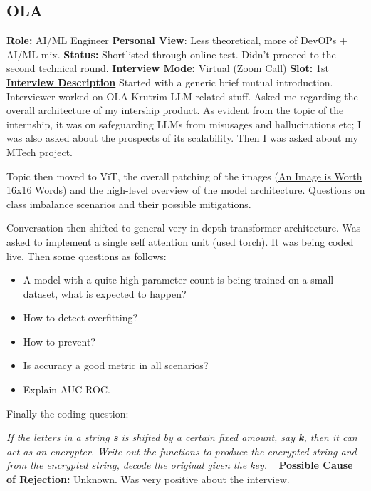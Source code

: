 \documentclass[12pt]{article}
\begin{document}
\subsection{OLA}


\textbf{Role:} AI/ML Engineer
\newline
\textbf{Personal View}: Less theoretical, more of DevOPs + AI/ML mix.
\newline
\textbf{Status:} Shortlisted through online test. Didn't proceed to the second technical round.
\newline
\textbf{Interview Mode:} Virtual (Zoom Call)
\newline
\textbf{Slot:} 1st
\vspace{10pt}
\newline
\underline{\textbf{Interview Description}}
\newline
\newline
Started with a generic brief mutual introduction. Interviewer worked on OLA Krutrim LLM related stuff. Asked me regarding the overall architecture of my intership product. As evident from the topic of the internship, it was on safeguarding LLMs from misusages and hallucinations etc; I was also asked about the prospects of its scalability. Then I was asked about my MTech project.

Topic then moved to ViT, the overall patching of the images (\href{https://arxiv.org/abs/2010.11929}{An Image is Worth 16x16 Words}) and the high-level overview of the model architecture. Questions on class imbalance scenarios and their possible mitigations. 

Conversation then shifted to general very in-depth transformer architecture. Was asked to implement a single self attention unit (used torch). It was being coded live.
\newline
Then some questions as follows:
 \begin{itemize}
    \item A model with a quite high parameter count is being trained on a small dataset, what is expected to happen?
    \item How to detect overfitting?
    \item How to prevent? 
    \item Is accuracy a good metric in all scenarios?
    \item Explain AUC-ROC.
 \end{itemize}

Finally the coding question:

\textit{If the letters in a string \textbf{s} is shifted by a certain fixed amount, say \textbf{k}, then it can act as an encrypter. Write out the functions to produce the encrypted string and from the encrypted string, decode the original given the key.}
\newline
\vspace{1pt}\
\newline
\textbf{Possible Cause of Rejection:} Unknown. Was very positive about the interview.
\end{document}
